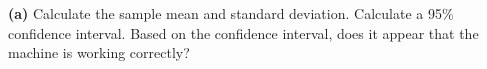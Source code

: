 {\bf(a)} Calculate the sample mean and standard deviation.  Calculate a 95\% confidence interval.   Based on the confidence interval, does it appear that the machine is working correctly?












